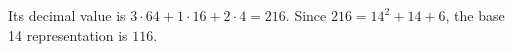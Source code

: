 Its decimal value is $3\cdot64+1\cdot16+2\cdot4=216$. Since $216=14^2+14+6$, the base 14 representation is $\boxed{116}$.
